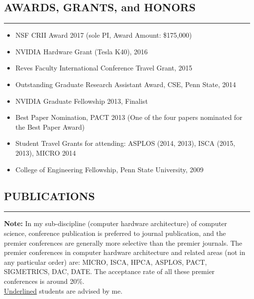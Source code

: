 \documentclass[10pt,a4]{article}
\begin{document}
\subsection*{AWARDS, GRANTS, and HONORS}
\hrule
\vspace{0.2cm}
\begin{itemize}
\item  NSF CRII Award 2017 (sole PI, Award Amount: \$175,000)
\item  NVIDIA Hardware Grant (Tesla K40), 2016 
\item  Reves Faculty International Conference Travel Grant, 2015 
\item  Outstanding Graduate Research Assistant Award, CSE, Penn State, 2014 
\item  NVIDIA Graduate Fellowship 2013, Finalist 
\item  Best Paper Nomination, PACT 2013 (One of the four papers nominated for the Best Paper Award) 
\item  Student Travel Grants for attending: ASPLOS (2014, 2013), ISCA (2015, 2013), MICRO 2014 
\item  College of Engineering Fellowship, Penn State University, 2009 
\end{itemize}

\subsection*{PUBLICATIONS}
\hrule
\vspace{0.2cm}
{\bf Note:} In my sub-discipline (computer hardware architecture) of computer science, conference publication 
is preferred to journal publication, and the premier conferences are generally more selective than the premier journals. 
The premier conferences in computer hardware architecture and related areas (not in any particular order)
are: MICRO, ISCA, HPCA, ASPLOS, PACT, SIGMETRICS, DAC, DATE. The
acceptance rate of all these premier conferences is around 20\%. \\
 
\underline{Underlined} students are advised by me. %
\end{document}
